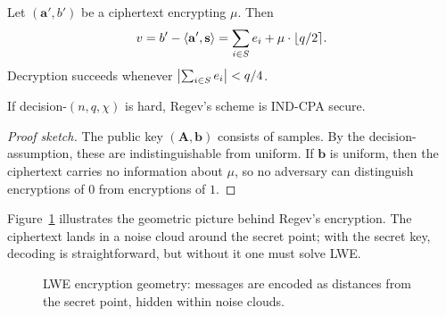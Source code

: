 \begin{theorem}[Correctness]
\label{thm:regev-correct}
Let $(\mathbf{a}', b')$ be a ciphertext encrypting $\mu$.  Then
\begin{equation}
v = b' - \left\langle \mathbf{a}', \mathbf{s} \right\rangle = \sum_{i\in S} e_i + \mu\cdot\lfloor q/2\rceil.
\end{equation}
Decryption succeeds whenever $\left\lvert \sum_{i\in S} e_i \right\rvert < q/4$.
\end{theorem}

\begin{theorem}[Security]
\label{thm:regev-security}
If decision-\lwe{}$(n,q,\chi)$ is hard, Regev's scheme is IND-CPA secure.
\end{theorem}

\begin{proof}[Proof sketch]
The public key $(\mathbf{A}, \mathbf{b})$ consists of \lwe{} samples.  By the decision-\lwe{} assumption, these are indistinguishable from uniform.  If $\mathbf{b}$ is uniform, then the ciphertext carries no information about $\mu$, so no adversary can distinguish encryptions of $0$ from encryptions of $1$.
\end{proof}

Figure~\ref{fig:ch07-encryption-geometry} illustrates the geometric picture behind Regev's encryption.  The ciphertext lands in a noise cloud around the secret point; with the secret key, decoding is straightforward, but without it one must solve LWE.

\begin{figure}[t]
\centering
{}
\caption{LWE encryption geometry: messages are encoded as distances from the secret point, hidden within noise clouds.}
\label{fig:ch07-encryption-geometry}
\end{figure}

